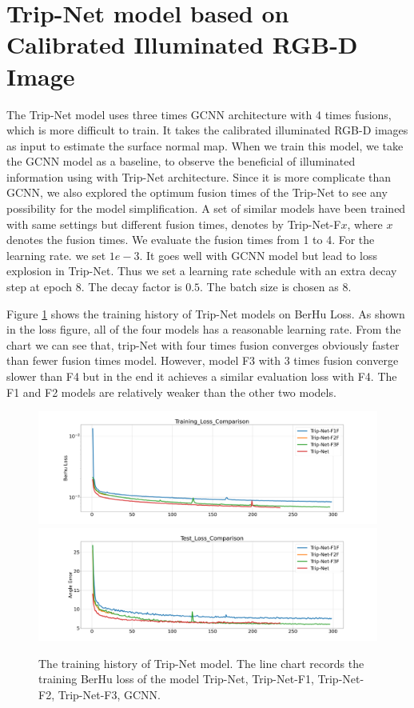 \documentclass[border=15pt, multi, tikz]{article}
\begin{document}
\section{Trip-Net model based on Calibrated Illuminated RGB-D Image}
The Trip-Net model uses three times GCNN architecture with 4 times fusions, which is more difficult to train. It takes the calibrated illuminated RGB-D images as input to estimate the surface normal map. When we train this model, we take the GCNN model as a baseline, to observe the beneficial of illuminated information using with Trip-Net architecture.
 Since it is more complicate than GCNN, we also explored the optimum fusion times of the Trip-Net to see any possibility for the model simplification. A set of similar models have been trained with same settings but different fusion times, denotes by Trip-Net-F$ x $, where $ x $ denotes the fusion times. We evaluate the fusion times from 1 to 4. For the learning rate.  we set $ 1e-3 $. It goes well with GCNN model but lead to loss explosion in Trip-Net. Thus we set a learning rate schedule with an extra decay step at epoch 8. The decay factor is $ 0.5$. The batch size is chosen as 8.

Figure \ref{fig:trip-net-training-history} shows the training history of Trip-Net models on BerHu Loss. As shown in the loss figure, all of the four models has a reasonable learning rate. 
From the chart we can see that, trip-Net with four times fusion converges obviously faster than fewer fusion times model. However, model F3 with 3 times fusion converge slower than F4 but in the end it achieves a similar evaluation loss with F4. The F1 and F2 models are relatively weaker than the other two models. 


\begin{figure}[H]
	\centering
	\includegraphics[width=\textwidth]{./Figures/trip_net_training_loss.png}
	\includegraphics[width=\textwidth]{./Figures/trip_net_eval_loss.png}
	\caption{The training history of Trip-Net model. The line chart records the training BerHu loss of the model Trip-Net, Trip-Net-F1, Trip-Net-F2, Trip-Net-F3, GCNN.}
	\label{fig:trip-net-training-history}
\end{figure}
\end{document}
